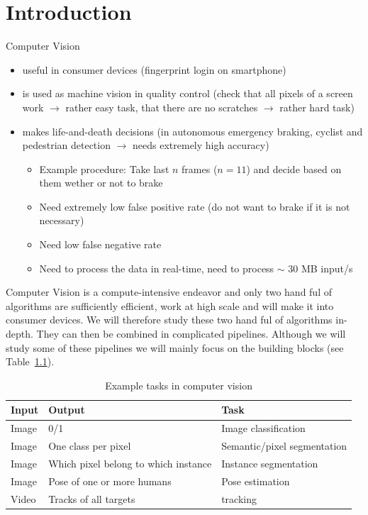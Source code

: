 \chapter{Introduction}

Computer Vision
\begin{itemize}
\item useful in consumer devices (\eg fingerprint login on smartphone)
\item is used as machine vision in quality control (\eg check that all
  pixels of a screen work $\rightarrow$ rather easy task, that there
  are no scratches $\rightarrow$ rather hard task)
\item makes life-and-death decisions (\eg in autonomous emergency
  braking, cyclist and pedestrian detection $\rightarrow$ needs
  extremely high accuracy)
  \begin{itemize}
  \item Example procedure: Take last $n$ frames (\eg $n = 11$) and
    decide based on them wether or not to brake
  \item Need extremely low false positive rate (do not want to brake
    if it is not necessary)
  \item Need low false negative rate
  \item Need to process the data in real-time, \ie need to process
    $\sim$ 30 MB input/s
  \end{itemize}
\end{itemize}
Computer Vision is a compute-intensive endeavor and only two hand ful
of algorithms are sufficiently efficient, \ie work at high scale and
will make it into consumer devices. We will therefore study these two
hand ful of algorithms in-depth. They can then be combined in
complicated pipelines. Although we will study some of these pipelines
we will mainly focus on the building blocks (see
Table~\ref{tab:ex:tasks}).

\begin{table}[htpb]
  \centering
  \begin{tabular}{lll}
    \toprule
    Input & Output & Task \\
    \midrule
    Image & 0/1 & Image classification \\
    Image & One class per pixel & Semantic/pixel segmentation \\
    Image & Which pixel belong to which instance & Instance segmentation \\
    Image & Pose of one or more humans & Pose estimation \\
    Video & Tracks of all targets & tracking \\ \bottomrule
  \end{tabular}
  \caption{Example tasks in computer vision}%
  \label{tab:ex:tasks}
\end{table}

